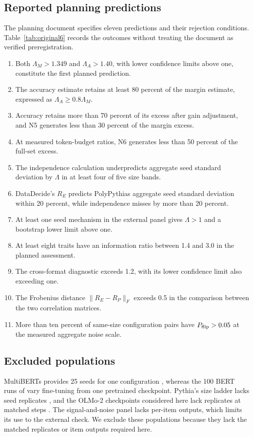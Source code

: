 \subsection{Reported planning predictions}
The planning document specifies eleven predictions and their rejection conditions. Table~\ref{tab:original6} records the outcomes without treating the document as verified preregistration.
\begin{enumerate}
\item Both $\Lambda_M>1.349$ and $\Lambda_A>1.40$, with lower confidence limits above one, constitute the first planned prediction.
\item The accuracy estimate retains at least 80 percent of the margin estimate, expressed as $\Lambda_A\geq0.8\Lambda_M$.
\item Accuracy retains more than 70 percent of its excess after gain adjustment, and N5 generates less than 30 percent of the margin excess.
\item At measured token-budget ratios, N6 generates less than 50 percent of the full-set excess.
\item The independence calculation underpredicts aggregate seed standard deviation by $\Lambda$ in at least four of five size bands.
\item DataDecide's $R_E$ predicts PolyPythias aggregate seed standard deviation within 20 percent, while independence misses by more than 20 percent.
\item At least one seed mechanism in the external panel gives $\Lambda>1$ and a bootstrap lower limit above one.
\item At least eight traits have an information ratio between 1.4 and 3.0 in the planned assessment.
\item The cross-format diagnostic exceeds 1.2, with its lower confidence limit also exceeding one.
\item The Frobenius distance $\|R_E-R_P\|_F$ exceeds 0.5 in the comparison between the two correlation matrices.
\item More than ten percent of same-size configuration pairs have $P_{\rm flip}>0.05$ at the measured aggregate noise scale.
\end{enumerate}

\subsection{Excluded populations}
MultiBERTs provides 25 seeds for one configuration \citep{sellam2022}, whereas the 100 BERT runs of \citet{mccoy2020} vary fine-tuning from one pretrained checkpoint. Pythia's size ladder lacks seed replicates \citep{biderman2023}, and the OLMo-2 checkpoints considered here lack replicates at matched steps \citep{teamolmo2025}. The signal-and-noise panel lacks per-item outputs, which limits its use to the external check. We exclude these populations because they lack the matched replicates or item outputs required here.

